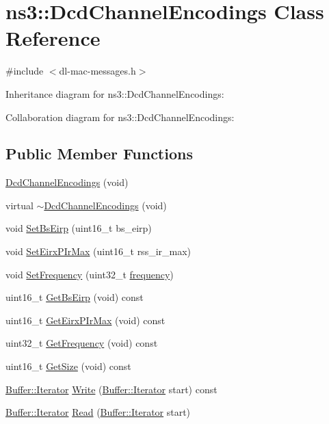\hypertarget{classns3_1_1DcdChannelEncodings}{}\section{ns3\+:\+:Dcd\+Channel\+Encodings Class Reference}
\label{classns3_1_1DcdChannelEncodings}


{\ttfamily \#include $<$dl-\/mac-\/messages.\+h$>$}



Inheritance diagram for ns3\+:\+:Dcd\+Channel\+Encodings\+:


Collaboration diagram for ns3\+:\+:Dcd\+Channel\+Encodings\+:
\subsection*{Public Member Functions}
\begin{DoxyCompactItemize}
\item 
\hyperlink{classns3_1_1DcdChannelEncodings_ad5cbe0146f761fbf0e78e2c1b2d2f3b8}{Dcd\+Channel\+Encodings} (void)
\item 
virtual \hyperlink{classns3_1_1DcdChannelEncodings_aabee6e3f1994a06b6dad5339a10d5eb1}{$\sim$\+Dcd\+Channel\+Encodings} (void)
\item 
void \hyperlink{classns3_1_1DcdChannelEncodings_a63b3ad9d5c7a5d1ebcf143fb34cb1c21}{Set\+Bs\+Eirp} (uint16\+\_\+t bs\+\_\+eirp)
\item 
void \hyperlink{classns3_1_1DcdChannelEncodings_a877ba07d71abaf59df2cff0f2f74e7ce}{Set\+Eirx\+P\+Ir\+Max} (uint16\+\_\+t rss\+\_\+ir\+\_\+max)
\item 
void \hyperlink{classns3_1_1DcdChannelEncodings_a7265878c3b1c112ac710458a66c0d53c}{Set\+Frequency} (uint32\+\_\+t \hyperlink{mmwave_2model_2fading-traces_2fading__trace__generator_8m_a09045328d6d7e16aa4013f526cc6993d}{frequency})
\item 
uint16\+\_\+t \hyperlink{classns3_1_1DcdChannelEncodings_ab52d2cecbbc31df5375b2fbf2ac566b0}{Get\+Bs\+Eirp} (void) const 
\item 
uint16\+\_\+t \hyperlink{classns3_1_1DcdChannelEncodings_add8877e970b98aaf701abc6683f2bb7a}{Get\+Eirx\+P\+Ir\+Max} (void) const 
\item 
uint32\+\_\+t \hyperlink{classns3_1_1DcdChannelEncodings_a3232ca053d0d271430686c4a71d21296}{Get\+Frequency} (void) const 
\item 
uint16\+\_\+t \hyperlink{classns3_1_1DcdChannelEncodings_a1d81142f9693f707535abca720f322a4}{Get\+Size} (void) const 
\item 
\hyperlink{classns3_1_1Buffer_1_1Iterator}{Buffer\+::\+Iterator} \hyperlink{classns3_1_1DcdChannelEncodings_af4bef1c041881e8df291c781985c0f8e}{Write} (\hyperlink{classns3_1_1Buffer_1_1Iterator}{Buffer\+::\+Iterator} start) const 
\item 
\hyperlink{classns3_1_1Buffer_1_1Iterator}{Buffer\+::\+Iterator} \hyperlink{classns3_1_1DcdChannelEncodings_a76b21a6da53bf3294c368e74ab68cfb1}{Read} (\hyperlink{classns3_1_1Buffer_1_1Iterator}{Buffer\+::\+Iterator} start)
\end{DoxyCompactItemize}
